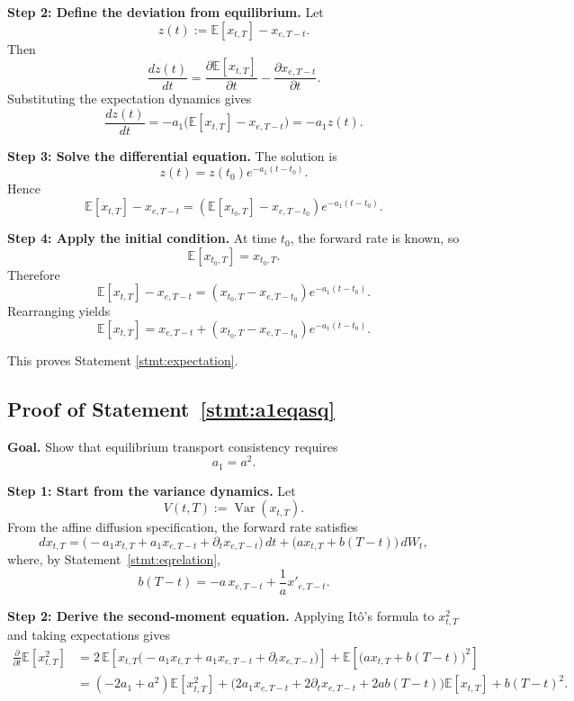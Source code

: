 \documentclass[12pt]{article}
\theoremstyle{statementstyle}
\begin{document}
\begin{appendices}
\medskip
\noindent\textbf{Step 2: Define the deviation from equilibrium.}
Let
\[
z(t):=\mathbb{E}[x_{t,T}] - x_{e,T-t}.
\]
Then
\[
\frac{dz(t)}{dt}
=
\frac{\partial \mathbb{E}[x_{t,T}]}{\partial t}
-
\frac{\partial x_{e,T-t}}{\partial t}.
\]
Substituting the expectation dynamics gives
\[
\frac{dz(t)}{dt}
=
-a_1\bigl(\mathbb{E}[x_{t,T}] - x_{e,T-t}\bigr)
=
-a_1 z(t).
\]

\medskip
\noindent\textbf{Step 3: Solve the differential equation.}
The solution is
\[
z(t)=z(t_0)e^{-a_1(t-t_0)}.
\]
Hence
\[
\mathbb{E}[x_{t,T}] - x_{e,T-t}
=
\left(\mathbb{E}[x_{t_0,T}] - x_{e,T-t_0}\right)e^{-a_1(t-t_0)}.
\]

\medskip
\noindent\textbf{Step 4: Apply the initial condition.}
At time \(t_0\), the forward rate is known, so
\[
\mathbb{E}[x_{t_0,T}] = x_{t_0,T}.
\]
Therefore
\[
\mathbb{E}[x_{t,T}] - x_{e,T-t}
=
\left(x_{t_0,T} - x_{e,T-t_0}\right)e^{-a_1(t-t_0)}.
\]
Rearranging yields
\begin{equation}
\mathbb{E}[x_{t,T}]
=
x_{e,T-t}
+
\left(x_{t_0,T}-x_{e,T-t_0}\right)e^{-a_1(t-t_0)}.
\tag{A.3.1}\label{eq:A31}
\end{equation}

This proves Statement \ref{stmt:expectation}.
\subsection{Proof of Statement~\ref{stmt:a1eqasq}}
\label{appendix:A4}

\textbf{Goal.}
Show that equilibrium transport consistency requires
\[
a_1=a^2.
\]

\medskip
\noindent\textbf{Step 1: Start from the variance dynamics.}
Let
\[
V(t,T):=\operatorname{Var}(x_{t,T}).
\]
From the affine diffusion specification, the forward rate satisfies
\[
dx_{t,T}
=
\bigl(-a_1x_{t,T}+a_1x_{e,T-t}+\partial_t x_{e,T-t}\bigr)\,dt
+
\bigl(a x_{t,T}+b(T-t)\bigr)\,dW_t,
\]
where, by Statement~\ref{stmt:eqrelation},
\[
b(T-t)=-a\,x_{e,T-t}+\frac{1}{a}x'_{e,T-t}.
\]

\medskip
\noindent\textbf{Step 2: Derive the second-moment equation.}
Applying It\^o's formula to \(x_{t,T}^2\) and taking expectations gives
\begin{align}
\frac{\partial}{\partial t}\mathbb{E}[x_{t,T}^2]
&=
2\,\mathbb{E}\!\left[x_{t,T}
\bigl(-a_1x_{t,T}+a_1x_{e,T-t}+\partial_t x_{e,T-t}\bigr)\right]
+
\mathbb{E}\!\left[\bigl(a x_{t,T}+b(T-t)\bigr)^2\right]
\nonumber\\
&=
(-2a_1+a^2)\mathbb{E}[x_{t,T}^2]
+
\bigl(2a_1x_{e,T-t}+2\partial_t x_{e,T-t}+2ab(T-t)\bigr)\mathbb{E}[x_{t,T}]
+
b(T-t)^2.
\tag{A.4.1}\label{eq:A41}
\end{align}


\end{appendices}
\end{document}
